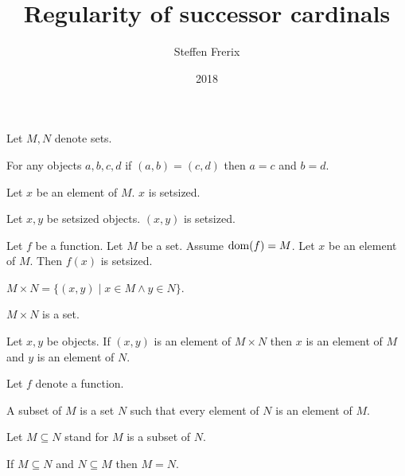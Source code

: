\documentclass{article}
\title{Regularity of successor cardinals}
\author{Steffen Frerix}
\date{2018}
\newcommand{\Prod}[2]{#1\times #2}
\begin{document}

  \maketitle

  \begin{forthel}

    Let $M,N$ denote sets.

    \begin{axiom}
      For any objects $a,b,c,d$ if $(a,b) = (c,d)$ then $a = c$ and $b = d$.
    \end{axiom}

    \begin{axiom}
      Let $x$ be an element of $M$. $x$ is setsized.
    \end{axiom}

    \begin{axiom}
      Let $x,y$ be setsized objects. $(x, y)$ is setsized.
    \end{axiom}

    \begin{axiom}
      Let $f$ be a function.
      Let $M$ be a set.
      Assume $\operatorname{dom}(f) = M$.
      Let $x$ be an element of $M$. Then $f(x)$ is setsized.
    \end{axiom}

    \begin{definition}
      $\Prod{M}{N} = \{(x,y) \mid x \in M \wedge y \in N\}$.
    \end{definition}

    \begin{axiom}
      $\Prod{M}{N}$ is a set.
    \end{axiom}

    \begin{lemma}
      Let $x,y$ be objects.
      If $(x,y)$ is an element of $\Prod{M}{N}$
      then $x$ is an element of $M$ and $y$ is an element of $N$.
    \end{lemma}

    Let $f$ denote a function.

    \begin{definition}
      A subset of $M$ is a set $N$ such that every element of $N$ is an element of $M$.
    \end{definition}

    Let $M\subseteq N$ stand for $M$ is a subset of $N$.

    \begin{axiom}[Extensionality]
      If $M\subseteq N$ and $N\subseteq M$ then $M = N$.
    \end{axiom}


\end{forthel}
\end{document}
